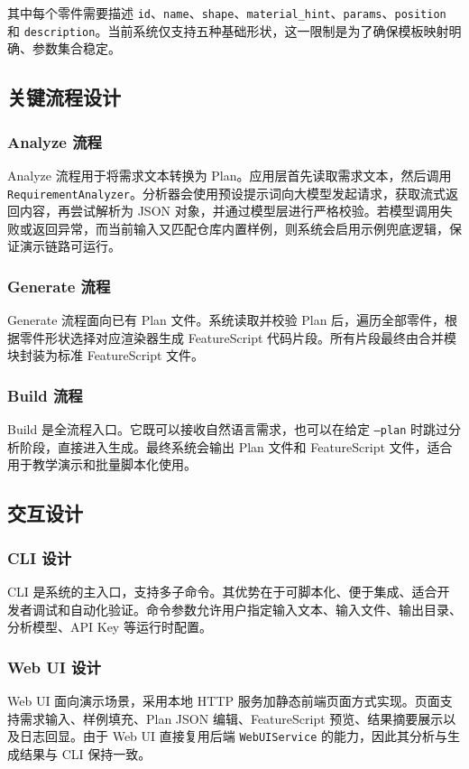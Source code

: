 其中每个零件需要描述 \texttt{id}、\texttt{name}、\texttt{shape}、\texttt{material\_hint}、\texttt{params}、\texttt{position} 和 \texttt{description}。当前系统仅支持五种基础形状，这一限制是为了确保模板映射明确、参数集合稳定。

\subsection{关键流程设计}

\subsubsection{Analyze 流程}

Analyze 流程用于将需求文本转换为 Plan。应用层首先读取需求文本，然后调用 \texttt{RequirementAnalyzer}。分析器会使用预设提示词向大模型发起请求，获取流式返回内容，再尝试解析为 JSON 对象，并通过模型层进行严格校验。若模型调用失败或返回异常，而当前输入又匹配仓库内置样例，则系统会启用示例兜底逻辑，保证演示链路可运行。

\subsubsection{Generate 流程}

Generate 流程面向已有 Plan 文件。系统读取并校验 Plan 后，遍历全部零件，根据零件形状选择对应渲染器生成 FeatureScript 代码片段。所有片段最终由合并模块封装为标准 FeatureScript 文件。

\subsubsection{Build 流程}

Build 是全流程入口。它既可以接收自然语言需求，也可以在给定 \texttt{--plan} 时跳过分析阶段，直接进入生成。最终系统会输出 Plan 文件和 FeatureScript 文件，适合用于教学演示和批量脚本化使用。

\subsection{交互设计}

\subsubsection{CLI 设计}

CLI 是系统的主入口，支持多子命令。其优势在于可脚本化、便于集成、适合开发者调试和自动化验证。命令参数允许用户指定输入文本、输入文件、输出目录、分析模型、API Key 等运行时配置。

\subsubsection{Web UI 设计}

Web UI 面向演示场景，采用本地 HTTP 服务加静态前端页面方式实现。页面支持需求输入、样例填充、Plan JSON 编辑、FeatureScript 预览、结果摘要展示以及日志回显。由于 Web UI 直接复用后端 \texttt{WebUIService} 的能力，因此其分析与生成结果与 CLI 保持一致。
